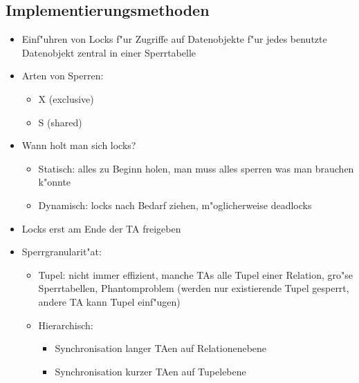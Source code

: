 \documentclass[a4paper, 12pt]{scrartcl}
\begin{document}
\subsection{Implementierungsmethoden}
\begin{itemize}
	\item
		Einf"uhren von Locks f"ur Zugriffe auf Datenobjekte f"ur jedes benutzte Datenobjekt zentral in einer Sperrtabelle
	\item Arten von Sperren:
		\begin{itemize}
			\item
				X (exclusive)
			\item
				S (shared)
		\end{itemize}

	\item Wann holt man sich locks?
		\begin{itemize}
			\item
				Statisch: alles zu Beginn holen, man muss alles sperren was man brauchen k"onnte
			\item
				Dynamisch: locks nach Bedarf ziehen, m"oglicherweise deadlocks
		\end{itemize}
	\item
		Locks erst am Ende der TA freigeben
	\item
		Sperrgranularit"at:
		\begin{itemize}
			\item
				Tupel: nicht immer effizient, manche TAs alle Tupel einer Relation, gro"se Sperrtabellen, Phantomproblem (werden nur existierende Tupel gesperrt, andere TA kann Tupel einf"ugen)
			\item
				Hierarchisch:
				\begin{itemize}
					\item Synchronisation langer TAen auf Relationenebene
					\item
						Synchronisation kurzer TAen auf Tupelebene
				\end{itemize}


\end{itemize}
\end{itemize}
\end{document}
